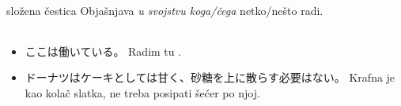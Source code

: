 \documentclass[intermediate]{grampig}
\begin{document}
	\begin{minipage}{\width}
		 \hfill složena čestica \br
		Objašnjava \textit{u svojstvu koga/čega} netko/nešto radi.
		
		\begin{table}
			\centering
			\begin{tabular}{@{}ccccc@{}}
			\end{tabular}
		\end{table}
		
		\begin{itemize}
			\item ここは働いている。\bh
			Radim tu .
			\item ドーナツはケーキとしては甘く、砂糖を上に散らす必要はない。\bh
			Krafna je kao kolač slatka, ne treba posipati šećer po njoj.
		\end{itemize}
	\end{minipage}
\end{document}

